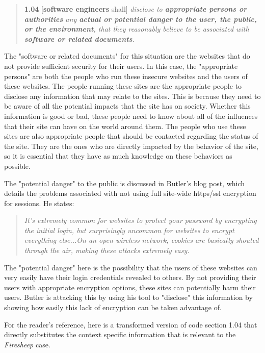 \documentclass[11pt]{article}
\begin{document}
\begin{multicols}{2}
\begin{quote}
  \textbf{1.04} [\textbf{software engineers} shall] \emph{disclose to \textbf{appropriate persons or authorities} any \textbf{actual or potential danger to the user, the public, or the environment}, that they reasonably believe to be associated with \textbf{software or related documents}.} \cite{se_code}
\end{quote}

The "software or related documents" for this situation are the websites that do not provide sufficient security for their users. In this case, the "appropriate persons" are both the people who run these insecure websites and the users of these websites. The people running these sites are the appropriate people to disclose any information that may relate to the sites. This is because they need to be aware of all the potential impacts that the site has on society. Whether this information is good or bad, these people need to know about all of the influences that their site can have on the world around them. The people who use these sites are also appropriate people that should be contacted regarding the status of the site. They are the ones who are directly impacted by the behavior of the site, so it is essential that they have as much knowledge on these behaviors as possible. 

The "potential danger" to the public is discussed in Butler's blog post, which details the problems associated with not using full site-wide https/ssl encryption for sessions. He states:

\begin{quote}
  \emph{It's extremely common for websites to protect your password by encrypting the initial login, but surprisingly uncommon for websites to encrypt everything else...On an open wireless network, cookies are basically shouted through the air, making these attacks extremely easy.} \cite{codebutler_main}
\end{quote}

The "potential danger" here is the possibility that the users of these websites can very easily have their login credentials revealed to others.
By not providing their users with appropriate encryption options, these sites can potentially harm their users. Butler is attacking this by using his tool to "disclose" this information by showing how easily this lack of encryption can be taken advantage of.

For the reader's reference, here is a transformed version of code section 1.04 that directly substitutes the context specific information that is relevant to the \emph{Firesheep} case.


\end{multicols}
\end{document}
